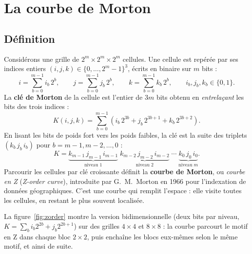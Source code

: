 \documentclass[11pt,a4paper]{article}
\begin{document}
\section{La courbe de Morton}

\subsection{Définition}

Considérons une grille de $2^m \times 2^m \times 2^m$ cellules. Une cellule est repérée par ses
indices entiers $(i, j, k) \in \{0, \dots, 2^m-1\}^3$, écrits en binaire sur $m$ bits :
\begin{equation}
i = \sum_{b=0}^{m-1} i_b\, 2^b, \qquad
j = \sum_{b=0}^{m-1} j_b\, 2^b, \qquad
k = \sum_{b=0}^{m-1} k_b\, 2^b,
\qquad i_b, j_b, k_b \in \{0, 1\}.
\end{equation}
La \textbf{clé de Morton} de la cellule est l'entier de $3m$ bits obtenu en \emph{entrelaçant} les
bits des trois indices :
\begin{equation}
K(i, j, k) = \sum_{b=0}^{m-1} \left( i_b\, 2^{3b} + j_b\, 2^{3b+1} + k_b\, 2^{3b+2} \right).
\label{eq:morton}
\end{equation}
En lisant les bits de poids fort vers les poids faibles, la clé est la suite des triplets
$(k_b\, j_b\, i_b)$ pour $b = m-1, m-2, \dots, 0$ :
\[
K = \underbrace{k_{m-1}\, j_{m-1}\, i_{m-1}}_{\text{niveau } 1}\;
    \underbrace{k_{m-2}\, j_{m-2}\, i_{m-2}}_{\text{niveau } 2}\;\cdots\;
    \underbrace{k_0\, j_0\, i_0}_{\text{niveau } m}.
\]
Parcourir les cellules par clé croissante définit la \textbf{courbe de Morton}, ou
\emph{courbe en Z} (\emph{Z-order curve}), introduite par G.~M.~Morton en 1966 pour l'indexation
de données géographiques. C'est une courbe qui remplit l'espace : elle visite toutes les cellules,
en restant le plus souvent localisée.

La figure~\ref{fig:zorder} montre la version bidimensionnelle (deux bits par niveau,
$K = \sum_b i_b 2^{2b} + j_b 2^{2b+1}$) sur des grilles $4 \times 4$ et $8 \times 8$ : la courbe
parcourt le motif en \og Z\fg{} dans chaque bloc $2\times 2$, puis enchaîne les blocs eux-mêmes
selon le même motif, et ainsi de suite.
\end{document}
